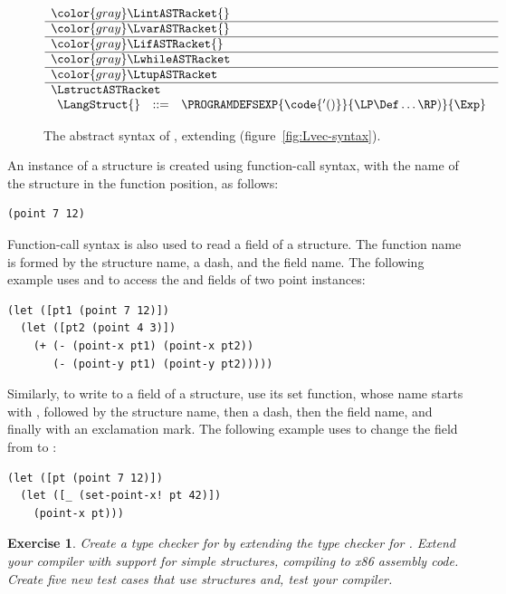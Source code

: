 \documentclass[7x10]{TimesAPriori_MIT}%
\newcommand{\gray}[1]{{\color{gray} #1}}
\newtheorem{exercise}[theorem]{Exercise}
\numberwithin{theorem}{chapter}
\numberwithin{definition}{chapter}
\numberwithin{equation}{chapter}
\begin{document}
{\begin{figure}[tbp]
\centering
\begin{tcolorbox}[colback=white]
    \small
\[
\begin{array}{l}
  \gray{\LintASTRacket{}} \\ \hline
  \gray{\LvarASTRacket{}} \\ \hline
  \gray{\LifASTRacket{}} \\ \hline
  \gray{\LwhileASTRacket} \\ \hline
  \gray{\LtupASTRacket} \\  \hline
  \LstructASTRacket \\
\begin{array}{lcl}
  \LangStruct{} &::=& \PROGRAMDEFSEXP{\code{'()}}{\LP\Def\ldots\RP)}{\Exp}
\end{array}
\end{array}
\]
\end{tcolorbox}

\caption{The abstract syntax of \LangStruct{}, extending \LangVec{}
  (figure~\ref{fig:Lvec-syntax}).}
\label{fig:Lstruct-syntax}
\end{figure}

An instance of a structure is created using function-call syntax, with
the name of the structure in the function position, as follows:
\begin{lstlisting}
(point 7 12)
\end{lstlisting}
Function-call syntax is also used to read a field of a structure. The
function name is formed by the structure name, a dash, and the field
name. The following example uses  and  to
access the  and  fields of two point instances:
\begin{center}
\begin{lstlisting}
(let ([pt1 (point 7 12)])
  (let ([pt2 (point 4 3)])
    (+ (- (point-x pt1) (point-x pt2))
       (- (point-y pt1) (point-y pt2)))))
\end{lstlisting}
\end{center}
Similarly, to write to a field of a structure, use its set function,
whose name starts with , followed by the structure name,
then a dash, then the field name, and finally with an exclamation
mark. The following example uses  to change the
 field from  to :
\begin{center}
  \begin{lstlisting}
(let ([pt (point 7 12)])
  (let ([_ (set-point-x! pt 42)])
    (point-x pt)))
\end{lstlisting}
\end{center}

\begin{exercise}\normalfont\normalsize
  Create a type checker for \LangStruct{} by extending the type
  checker for \LangVec{}. Extend your compiler with support for simple
  structures, compiling \LangStruct{} to x86 assembly code. Create
  five new test cases that use structures and, test your compiler.
\end{exercise}


\clearpage
\fi}
\end{document}
